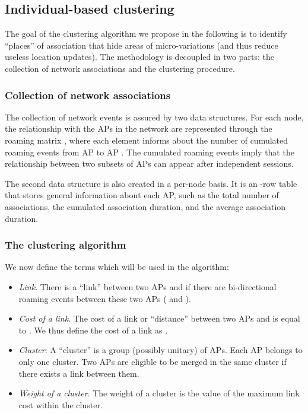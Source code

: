 \documentclass[a4paper]{sig-alternate-10pt}
\begin{document}
\subsection{Individual-based clustering}
\label{sec:clustering} \label{sec:algorithm}

The goal of the clustering algorithm we propose in the following is
to identify ``places'' of association that hide areas of
micro-variations (and thus reduce useless location updates). The
methodology is decoupled in two parts: the collection of network
associations and the clustering procedure.


\subsubsection{Collection of network associations}
\label{subsec:events}

The collection of network events is assured by two data structures.
For each node, the relationship with the  APs in the
network are represented through the roaming matrix , where each element  informs about the number
of cumulated roaming events from AP  to AP . The cumulated
roaming events imply that the relationship between two subsets of
APs can appear after independent sessions.

The second data structure is also created in a per-node basis.
It is an -row table that stores general information about each
AP, such as the total number of associations, the cumulated
association duration, and the average association duration.


\subsubsection{The clustering algorithm}
\label{subsec:algorithm}

We now define the terms which will be used in the algorithm:

\begin{itemize}

\item {\it Link}. There is a ``link''  between two APs 
and  if there are bi-directional roaming events between these two
APs ( and ).

\item {\it Cost of a link}. The cost of a link or ``distance''
between two APs  and  is equal to . We thus
define the cost of a link  as .

\item {\it Cluster}: A ``cluster'' is a group (possibly unitary) of
APs. Each AP belongs to only one cluster. Two APs are eligible to be
merged in the same cluster if there exists a link between them.

\item {\it Weight of a cluster}. The weight  of a cluster
 is the value of the maximum link cost within the cluster.

\end{itemize}
\end{document}
